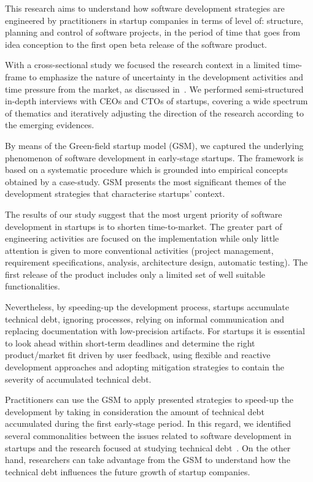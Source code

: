 \documentclass[10pt,journal,letterpaper,compsoc]{IEEEtran}
\begin{document}
This research aims to understand how software development strategies are
engineered by practitioners in startup companies in terms of level of:
structure, planning and control of software projects, in the period of time
that goes from idea conception to the first open beta release of the software
product.

With a cross-sectional study we focused the research context in a limited 
time-frame to emphasize the nature of uncertainty in the development activities 
and time pressure from the market, as discussed in~\cite{Maccormack2001,
Eisenhardt1998}. We performed semi-structured in-depth interviews with CEOs and
CTOs of startups, covering a wide spectrum of thematics and iteratively
adjusting the direction of the research according to the emerging evidences.

By means of the Green-field startup model (GSM), we captured the underlying
phenomenon of software development in early-stage startups. The framework is
based on a systematic procedure which is grounded into empirical concepts
obtained by a case-study. GSM presents the most significant themes of the
development strategies that characterise startups' context.

The results of our study suggest that the most urgent priority of software
development in startups is to shorten time-to-market. The greater part of
engineering activities are focused on the implementation while only little
attention is given to more conventional activities (project management,
requirement specifications, analysis, architecture design, automatic testing).
The first release of the product includes only a limited set of well suitable
functionalities.

Nevertheless, by speeding-up the development process, startups accumulate
technical debt, ignoring processes, relying on informal communication and
replacing documentation with low-precision artifacts. For startups it is
essential to look ahead within short-term deadlines and determine the right
product/market fit driven by user feedback, using flexible and reactive
development approaches and adopting mitigation strategies to contain the
severity of accumulated technical debt.

Practitioners can use the GSM to apply presented strategies to speed-up the
development by taking in consideration the amount of technical debt accumulated
during the first early-stage period. In this regard, we identified several
commonalities between the issues related to software development in startups and
the research focused at studying technical debt~\cite{Nugroho2011,Izurieta2012}.
On the other hand, researchers can take advantage from the GSM to understand
how the technical debt influences the future growth of startup companies.
\end{document}
